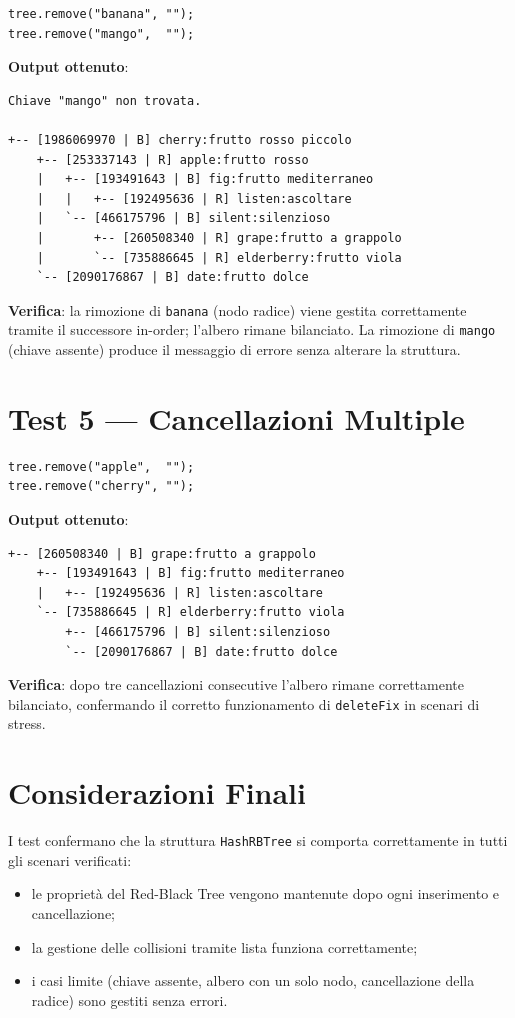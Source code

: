 \begin{lstlisting}
tree.remove("banana", "");
tree.remove("mango",  "");
\end{lstlisting}

\textbf{Output ottenuto}:

\begin{lstlisting}
Chiave "mango" non trovata.

+-- [1986069970 | B] cherry:frutto rosso piccolo
    +-- [253337143 | R] apple:frutto rosso
    |   +-- [193491643 | B] fig:frutto mediterraneo
    |   |   +-- [192495636 | R] listen:ascoltare
    |   `-- [466175796 | B] silent:silenzioso
    |       +-- [260508340 | R] grape:frutto a grappolo
    |       `-- [735886645 | R] elderberry:frutto viola
    `-- [2090176867 | B] date:frutto dolce
\end{lstlisting}

\textbf{Verifica}: la rimozione di \texttt{banana} (nodo radice) viene 
gestita correttamente tramite il successore in-order; l'albero rimane 
bilanciato. La rimozione di \texttt{mango} (chiave assente) produce 
il messaggio di errore senza alterare la struttura.

\section{Test 5 --- Cancellazioni Multiple}

\begin{lstlisting}
tree.remove("apple",  "");
tree.remove("cherry", "");
\end{lstlisting}

\textbf{Output ottenuto}:

\begin{lstlisting}
+-- [260508340 | B] grape:frutto a grappolo
    +-- [193491643 | B] fig:frutto mediterraneo
    |   +-- [192495636 | R] listen:ascoltare
    `-- [735886645 | R] elderberry:frutto viola
        +-- [466175796 | B] silent:silenzioso
        `-- [2090176867 | B] date:frutto dolce
\end{lstlisting}

\textbf{Verifica}: dopo tre cancellazioni consecutive l'albero rimane 
correttamente bilanciato, confermando il corretto funzionamento di 
\texttt{deleteFix} in scenari di stress.

\section{Considerazioni Finali}

I test confermano che la struttura \texttt{HashRBTree} si comporta 
correttamente in tutti gli scenari verificati:

\begin{itemize}
    \item le proprietà del Red-Black Tree vengono mantenute dopo ogni 
    inserimento e cancellazione;
    \item la gestione delle collisioni tramite lista funziona correttamente;
    \item i casi limite (chiave assente, albero con un solo nodo, 
    cancellazione della radice) sono gestiti senza errori.
\end{itemize}